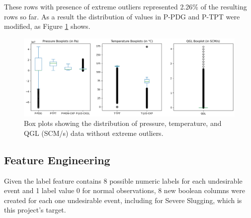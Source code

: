 \documentclass{article}
\begin{document}
These rows with presence of extreme outliers represented 2.26\% of the resulting rows so far. As a result the distribution of values in P-PDG and P-TPT were modified, as Figure \ref{fig:distr_boxplots_after_cleaning} shows.

\begin{figure}
\centering
\includegraphics[width=1\textwidth]{distr_boxplots_after_cleaning.png}
\caption{\label{fig:distr_boxplots_after_cleaning}Box plots showing the distribution of pressure, temperature, and QGL (SCM/s) data without extreme outliers.}
\end{figure}


\subsection{Feature Engineering}

Given the label feature contains 8 possible numeric labels for each undesirable event and 1 label value 0 for normal observations, 8 new boolean columns were created for each one undesirable event, including for Severe Slugging, which is this project's target.
\end{document}
